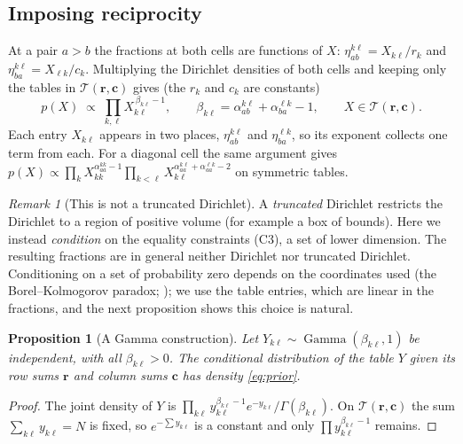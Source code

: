 \documentclass[11pt,a4paper]{article}
\newtheorem{proposition}{Proposition}
\theoremstyle{definition}
\theoremstyle{remark}
\newtheorem*{remark}{Remark}
\newcommand{\T}{\mathcal{T}}
\DeclareMathOperator{\Gam}{Gamma}
\begin{document}
\subsection{Imposing reciprocity}

At a pair $a>b$ the fractions at both cells are functions of $X$:
$\eta^{k\ell}_{ab} = X_{k\ell}/r_k$ and
$\eta^{k\ell}_{ba} = X_{\ell k}/c_k$. Multiplying the Dirichlet densities of
both cells and keeping only the tables in $\T(\bm r,\bm c)$ gives (the $r_k$
and $c_k$ are constants)
\begin{equation}
  \label{eq:prior}
  p(X) \;\propto\; \prod_{k,\ell}
  X_{k\ell}^{\,\beta_{k\ell} - 1},
  \qquad
  \beta_{k\ell} = \alpha^{k\ell}_{ab} + \alpha^{\ell k}_{ba} - 1,
  \qquad X \in \T(\bm r,\bm c).
\end{equation}
Each entry $X_{k\ell}$ appears in two places, $\eta^{k\ell}_{ab}$ and
$\eta^{\ell k}_{ba}$, so its exponent collects one term from each. For a
diagonal cell the same argument gives
$p(X) \propto \prod_{k} X_{kk}^{\alpha^{kk}_{aa}-1}
\prod_{k<\ell} X_{k\ell}^{\alpha^{k\ell}_{aa}+\alpha^{\ell k}_{aa}-2}$
on symmetric tables.

\begin{remark}[This is not a truncated Dirichlet]
A \emph{truncated} Dirichlet restricts the Dirichlet to a region of positive
volume (for example a box of bounds). Here we instead \emph{condition} on the
equality constraints (C3), a set of lower dimension. The resulting fractions
are in general neither Dirichlet nor truncated Dirichlet. Conditioning on a
set of probability zero depends on the coordinates used (the
Borel--Kolmogorov paradox; \citealp{kolmogorov1933grundbegriffe}); we use the
table entries, which are linear in the fractions, and the next proposition
shows this choice is natural.
\end{remark}

\begin{proposition}[A Gamma construction]
\label{prop:gamma}
Let $Y_{k\ell} \sim \Gam(\beta_{k\ell}, 1)$ be independent, with all
$\beta_{k\ell} > 0$. The conditional distribution of the table $Y$ given its
row sums $\bm r$ and column sums $\bm c$ has density \eqref{eq:prior}.
\end{proposition}
\begin{proof}
The joint density of $Y$ is
$\prod_{k\ell} y_{k\ell}^{\beta_{k\ell}-1} e^{-y_{k\ell}}/\Gamma(\beta_{k\ell})$.
On $\T(\bm r,\bm c)$ the sum $\sum_{k\ell} y_{k\ell} = N$ is fixed, so
$e^{-\sum y_{k\ell}}$ is a constant and only
$\prod y_{k\ell}^{\beta_{k\ell}-1}$ remains.
\end{proof}
\end{document}
